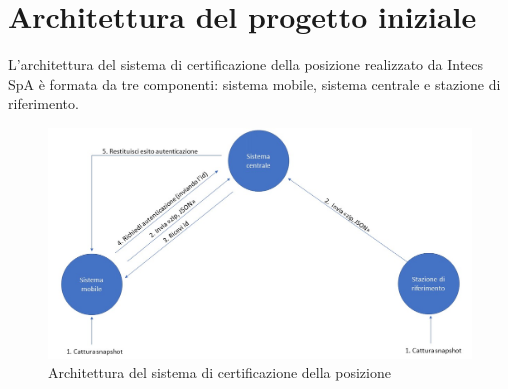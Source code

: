 \section{Architettura del progetto iniziale}
L'architettura del sistema di certificazione della posizione realizzato da Intecs SpA è formata da tre componenti: sistema mobile, sistema centrale e stazione di riferimento. 
\begin{figure}[h]
\centering
\includegraphics[scale=0.5]{images/schema progetto base.jpg}
\caption{Architettura del sistema di certificazione della posizione}
\label{fig: architetturabase }
\end{figure}
